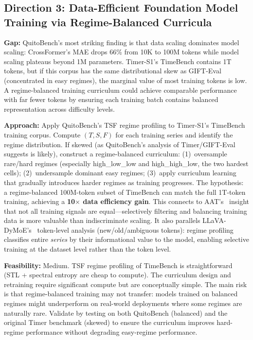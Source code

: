 \documentclass[11pt]{article}
\begin{document}
\subsection{Direction 3: Data-Efficient Foundation Model Training via Regime-Balanced Curricula}

\textbf{Gap:} QuitoBench's most striking finding is that data scaling dominates model scaling: CrossFormer's MAE drops 66\% from 10K to 100M tokens while model scaling plateaus beyond 1M parameters. Timer-S1's TimeBench contains 1T tokens, but if this corpus has the same distributional skew as GIFT-Eval (concentrated in easy regimes), the marginal value of most training tokens is low. A regime-balanced training curriculum could achieve comparable performance with far fewer tokens by ensuring each training batch contains balanced representation across difficulty levels.

\textbf{Approach:} Apply QuitoBench's TSF regime profiling to Timer-S1's TimeBench training corpus. Compute $(T, S, F)$ for each training series and identify the regime distribution. If skewed (as QuitoBench's analysis of Timer/GIFT-Eval suggests is likely), construct a regime-balanced curriculum: (1)~oversample rare/hard regimes (especially high\_low\_low and high\_high\_low, the two hardest cells); (2)~undersample dominant easy regimes; (3)~apply curriculum learning that gradually introduces harder regimes as training progresses. The hypothesis: a regime-balanced 100M-token subset of TimeBench can match the full 1T-token training, achieving a \textbf{10$\times$ data efficiency gain}. This connects to AAT's~\cite{aat} insight that not all training signals are equal---selectively filtering and balancing training data is more valuable than indiscriminate scaling. It also parallels LLaVA-DyMoE's~\cite{dymoe} token-level analysis (new/old/ambiguous tokens): regime profiling classifies entire \textit{series} by their informational value to the model, enabling selective training at the dataset level rather than the token level.

\textbf{Feasibility:} Medium. TSF regime profiling of TimeBench is straightforward (STL + spectral entropy are cheap to compute). The curriculum design and retraining require significant compute but are conceptually simple. The main risk is that regime-balanced training may not transfer: models trained on balanced regimes might underperform on real-world deployments where some regimes are naturally rare. Validate by testing on both QuitoBench (balanced) and the original Timer benchmark (skewed) to ensure the curriculum improves hard-regime performance without degrading easy-regime performance.
\end{document}
